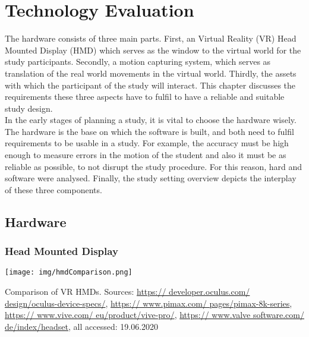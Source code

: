 \chapter{Technology Evaluation}
The hardware consists of three main parts. First, an Virtual Reality (VR) Head Mounted Display (HMD) which serves as the window to the virtual world for the study participants. Secondly, a motion capturing system, which serves as translation of the real world movements in the virtual world. Thirdly, the assets with which the participant of the study will interact. This chapter discusses the requirements these three aspects have to fulfil to have a reliable and suitable study design.\\ 
In the early stages of planning a study, it is vital to choose the hardware wisely. The hardware is the base on which the software is built, and both need to fulfil requirements to be usable in a study. For example, the accuracy must be high enough to measure errors in the motion of the student and also it must be as reliable as possible, to not disrupt the study procedure. For this reason, hard and software were analysed. Finally, the study setting overview depicts the interplay of these three components.

\section{Hardware}
\subsection{Head Mounted Display}
\begin{table}
	\centering
	\texttt{[image: img/hmdComparison.png]}
	\caption{Comparison of VR HMDs. Sources: \href{https://developer.oculus.com/design/oculus-device-specs/}{https:// developer.oculus.com/ design/oculus-device-specs/}, \href{https://www.pimax.com/pages/pimax-8k-series}{https:// www.pimax.com/ pages/pimax-8k-series}, \href{https://www.vive.com/eu/product/vive-pro/}{https:// www.vive.com/ eu/product/vive-pro/}, \href{https://www.valvesoftware.com/de/index/headset}{https:// www.valve software.com/ de/index/headset}, all accessed: 19.06.2020
	}
	\label{fig:hmdComparison}
\end{table}

